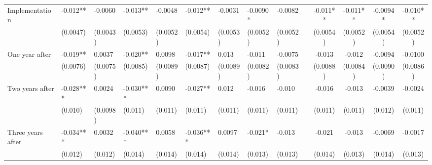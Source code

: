 \begin{tabular}{lccccrrrrrcccc}
Implementation & \multicolumn{1}{l}{-0.012**} & \multicolumn{1}{l}{-0.0060} & \multicolumn{1}{l}{-0.013**} & \multicolumn{1}{l}{-0.0048} & \multicolumn{1}{l}{-0.012**} & \multicolumn{1}{l}{-0.0031} & \multicolumn{1}{l}{-0.0090*} & \multicolumn{1}{l}{-0.0082} &       & -0.011** & -0.011** & -0.0094* & -0.010** \\
      & \multicolumn{1}{l}{(0.0047)} & \multicolumn{1}{l}{(0.0043)} & \multicolumn{1}{l}{(0.0053)} & \multicolumn{1}{l}{(0.0052)} & \multicolumn{1}{l}{(0.0054)} & \multicolumn{1}{l}{(0.0053)} & \multicolumn{1}{l}{(0.0052)} & \multicolumn{1}{l}{(0.0052)} &       & (0.0054) & (0.0052) & (0.0054) & (0.0052) \\
One year after & \multicolumn{1}{l}{-0.019**} & \multicolumn{1}{l}{0.0037} & \multicolumn{1}{l}{-0.020**} & \multicolumn{1}{l}{0.0098} & \multicolumn{1}{l}{-0.017**} & \multicolumn{1}{l}{0.013} & \multicolumn{1}{l}{-0.011} & \multicolumn{1}{l}{-0.0075} &       & -0.013 & -0.012 & -0.0094 & -0.0100 \\
      & \multicolumn{1}{l}{(0.0076)} & \multicolumn{1}{l}{(0.0075)} & \multicolumn{1}{l}{(0.0085)} & \multicolumn{1}{l}{(0.0089)} & \multicolumn{1}{l}{(0.0087)} & \multicolumn{1}{l}{(0.0089)} & \multicolumn{1}{l}{(0.0082)} & \multicolumn{1}{l}{(0.0083)} &       & (0.0088) & (0.0084) & (0.0090) & (0.0086) \\
Two years after & \multicolumn{1}{l}{-0.028***} & \multicolumn{1}{l}{0.0024} & \multicolumn{1}{l}{-0.030***} & \multicolumn{1}{l}{0.0090} & \multicolumn{1}{l}{-0.027**} & \multicolumn{1}{l}{0.012} & \multicolumn{1}{l}{-0.016} & \multicolumn{1}{l}{-0.010} &       & -0.016 & -0.013 & -0.0039 & -0.0024 \\
      & \multicolumn{1}{l}{(0.010)} & \multicolumn{1}{l}{(0.0098)} & \multicolumn{1}{l}{(0.011)} & \multicolumn{1}{l}{(0.011)} & \multicolumn{1}{l}{(0.011)} & \multicolumn{1}{l}{(0.011)} & \multicolumn{1}{l}{(0.011)} & \multicolumn{1}{l}{(0.011)} &       & (0.011) & (0.011) & (0.012) & (0.011) \\
Three years after & \multicolumn{1}{l}{-0.034***} & \multicolumn{1}{l}{0.0032} & \multicolumn{1}{l}{-0.040***} & \multicolumn{1}{l}{0.0058} & \multicolumn{1}{l}{-0.036***} & \multicolumn{1}{l}{0.0097} & \multicolumn{1}{l}{-0.021*} & \multicolumn{1}{l}{-0.013} &       & -0.021 & -0.013 & -0.0069 & -0.0017 \\
      & \multicolumn{1}{l}{(0.012)} & \multicolumn{1}{l}{(0.012)} & \multicolumn{1}{l}{(0.014)} & \multicolumn{1}{l}{(0.014)} & \multicolumn{1}{l}{(0.014)} & \multicolumn{1}{l}{(0.014)} & \multicolumn{1}{l}{(0.013)} & \multicolumn{1}{l}{(0.013)} &       & (0.014) & (0.013) & (0.014) & (0.013) \\

\end{tabular}
